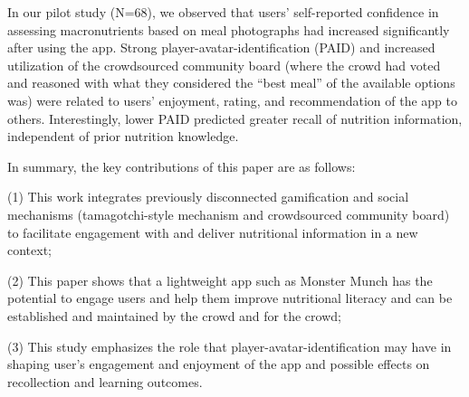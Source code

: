 In our pilot study (N=68), we observed that users' self-reported confidence in assessing macronutrients based on meal photographs had increased significantly after using the app. Strong player-avatar-identification (PAID) and increased utilization of the crowdsourced community board (where the crowd had voted and reasoned with what they considered the ``best meal'' of the available options was) were related to users' enjoyment, rating, and recommendation of the app to others. Interestingly, lower PAID predicted greater recall of nutrition information, independent of prior nutrition knowledge. 

In summary, the key contributions of this paper are as follows:

(1) This work integrates previously disconnected gamification and social mechanisms (tamagotchi-style mechanism and crowdsourced community board) to facilitate engagement with and deliver nutritional information in a new context;

(2) This paper shows that a lightweight app such as Monster Munch has the potential to engage users and help them improve nutritional literacy and can be established and maintained by the crowd and for the crowd; 

(3) This study emphasizes the role that player-avatar-identification may have in shaping user's engagement and enjoyment of the app and possible effects on recollection and learning outcomes.




